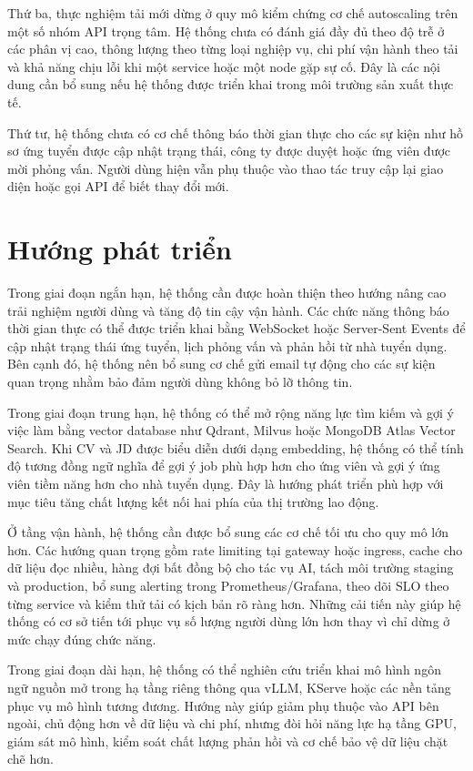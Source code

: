 \documentclass[../DoAn.tex]{subfiles}
\begin{document}
Thứ ba, thực nghiệm tải mới dừng ở quy mô kiểm chứng cơ chế autoscaling trên một số nhóm API trọng tâm. Hệ thống chưa có đánh giá đầy đủ theo độ trễ ở các phân vị cao, thông lượng theo từng loại nghiệp vụ, chi phí vận hành theo tải và khả năng chịu lỗi khi một service hoặc một node gặp sự cố. Đây là các nội dung cần bổ sung nếu hệ thống được triển khai trong môi trường sản xuất thực tế.

Thứ tư, hệ thống chưa có cơ chế thông báo thời gian thực cho các sự kiện như hồ sơ ứng tuyển được cập nhật trạng thái, công ty được duyệt hoặc ứng viên được mời phỏng vấn. Người dùng hiện vẫn phụ thuộc vào thao tác truy cập lại giao diện hoặc gọi API để biết thay đổi mới.

\section{Hướng phát triển}

Trong giai đoạn ngắn hạn, hệ thống cần được hoàn thiện theo hướng nâng cao trải nghiệm người dùng và tăng độ tin cậy vận hành. Các chức năng thông báo thời gian thực có thể được triển khai bằng WebSocket hoặc Server-Sent Events để cập nhật trạng thái ứng tuyển, lịch phỏng vấn và phản hồi từ nhà tuyển dụng. Bên cạnh đó, hệ thống nên bổ sung cơ chế gửi email tự động cho các sự kiện quan trọng nhằm bảo đảm người dùng không bỏ lỡ thông tin.

Trong giai đoạn trung hạn, hệ thống có thể mở rộng năng lực tìm kiếm và gợi ý việc làm bằng vector database như Qdrant, Milvus hoặc MongoDB Atlas Vector Search. Khi CV và JD được biểu diễn dưới dạng embedding, hệ thống có thể tính độ tương đồng ngữ nghĩa để gợi ý job phù hợp hơn cho ứng viên và gợi ý ứng viên tiềm năng hơn cho nhà tuyển dụng. Đây là hướng phát triển phù hợp với mục tiêu tăng chất lượng kết nối hai phía của thị trường lao động.

Ở tầng vận hành, hệ thống cần được bổ sung các cơ chế tối ưu cho quy mô lớn hơn. Các hướng quan trọng gồm rate limiting tại gateway hoặc ingress, cache cho dữ liệu đọc nhiều, hàng đợi bất đồng bộ cho tác vụ AI, tách môi trường staging và production, bổ sung alerting trong Prometheus/Grafana, theo dõi SLO theo từng service và kiểm thử tải có kịch bản rõ ràng hơn. Những cải tiến này giúp hệ thống có cơ sở tiến tới phục vụ số lượng người dùng lớn hơn thay vì chỉ dừng ở mức chạy đúng chức năng.

Trong giai đoạn dài hạn, hệ thống có thể nghiên cứu triển khai mô hình ngôn ngữ nguồn mở trong hạ tầng riêng thông qua vLLM, KServe hoặc các nền tảng phục vụ mô hình tương đương. Hướng này giúp giảm phụ thuộc vào API bên ngoài, chủ động hơn về dữ liệu và chi phí, nhưng đòi hỏi năng lực hạ tầng GPU, giám sát mô hình, kiểm soát chất lượng phản hồi và cơ chế bảo vệ dữ liệu chặt chẽ hơn.
\end{document}
